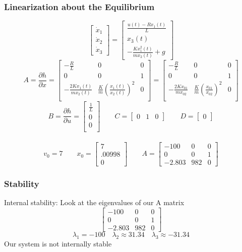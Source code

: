 \documentclass{beamer}
\begin{document}
\begin{frame}
\frametitle{Linearization about the Equilibrium}
$$
\begin{bmatrix}
\dot{x}_1 \\
\dot{x}_2 \\
\dot{x}_3
\end{bmatrix}
=
\begin{bmatrix}
\frac{u(t)-Rx_1(t)}{L} \\
x_3(t) \\
-\frac{Kx_1^2(t)}{mx_2(t)} + g
\end{bmatrix}
$$
$$
A
=
\frac{\partial h}{\partial x}
=
\begin{bmatrix}
-\frac{R}{L} & 0 & 0\\
0 & 0 & 1\\
-\frac{2Kx_1(t)}{mx_2(t)} & \frac{K}{m}(\frac{x_1(t)}{x_2(t)})^2 & 0\\
\end{bmatrix}
=
\begin{bmatrix}
-\frac{R}{L} & 0 & 0\\
0 & 0 & 1\\
-\frac{2Kx_{01}}{mx_{02}} & \frac{K}{m}(\frac{x_{01}}{x_{02}})^2 & 0\\
\end{bmatrix}
$$
$$
B
=
\frac{\partial h}{\partial u}
=
\begin{bmatrix}
\frac{1}{L} \\
0 \\
0 \\
\end{bmatrix}
\qquad
C
=
\begin{bmatrix}
0 & 1 & 0
\end{bmatrix}
\qquad
D
=
\begin{bmatrix}
0
\end{bmatrix}
$$
\\
$$
v_0 = 7 \qquad
x_0
=
\begin{bmatrix}
7 \\
.00998 \\
0
\end{bmatrix}
\qquad
A
=
\begin{bmatrix}
-100 & 0 & 0 \\
0 & 0 & 1 \\
-2.803 & 982 & 0
\end{bmatrix}
$$
\end{frame}

\begin{frame}
\frametitle{Stability}
Internal stability: Look at the eigenvalues of our A matrix
$$
\begin{bmatrix}
-100 & 0 & 0 \\
0 & 0 & 1 \\
-2.803 & 982 & 0
\end{bmatrix}
$$
$$ \lambda_1 = -100 \quad \lambda_2 \approx 31.34 \quad \lambda_3 \approx -31.34 $$
Our system is not internally stable

\end{frame}
\end{document}

